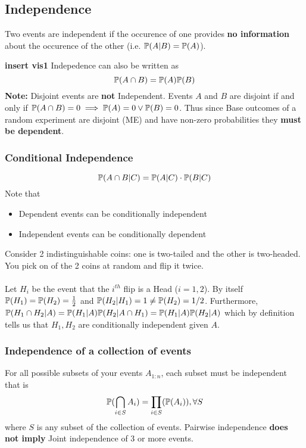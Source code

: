 \documentclass[11pt]{scrartcl}
\begin{document}
\subsection{Independence} 
\begin{definition}
  Two events are independent if the occurence of one provides \textbf{no
  information} about the occurence of the other (i.e. $\mathbb{P}(A|B) = \mathbb{P}(A)$). 
\end{definition}
\textbf{insert vis1}  
Indepedence can also be written as \[
  \mathbb{P}(A\cap B) = \mathbb{P}(A)\mathbb{P}(B)
\] 
\textbf{Note:} Disjoint events are \textbf{not} Independent. Events $A$ and
$B$ are disjoint if and only if $\mathbb{P}(A\cap B) = 0 \implies  \mathbb{P}(A)=0 \lor
\mathbb{P}(B)=0$. Thus since Base outcomes of a random experiment are disjoint (ME)
and have non-zero probabilities they \textbf{must be dependent}.

\subsubsection{Conditional Independence} 
\[
\mathbb{P}(A\cap B|C) = \mathbb{P}(A|C) \cdot \mathbb{P}(B|C)
\] 
Note that \begin{itemize}
  \item Dependent events can be conditionally independent
    \item Independent events can be conditionally dependent
\end{itemize}
\begin{example}
  Consider 2 indistinguishable coins: one is two-tailed and the other is
  two-headed. You pick on of the 2 coins at random and flip it twice. \\\\
  Let $H_{i}$ be the event that the $i^{th} $ flip is a Head ($i=1,2$). By
  itself $\mathbb{P}(H_1)=\mathbb{P}(H_2) = \frac{1}{2}$ and $\mathbb{P}(H_2|H_1) = 1 \neq
  \mathbb{P}(H_2) = 1/2$. Furthermore, $\mathbb{P}(H_1\cap H_2|A) = \mathbb{P}(H_1|A)\mathbb{P}(H_2|A\cap
  H_1)= \mathbb{P}(H_1|A)\mathbb{P}(H_2|A)$ which by definition tells us that $H_1,H_2$ are
  conditionally independent given $A$.
\end{example}

\subsubsection{Independence of a collection of events}
For all possible subsets of your events $A_{1:n} $, each subset must be
independent that is
\[
  \mathbb{P}(\bigcap_{i\in S}A_{i}) = \prod_{i\in S}(\mathbb{P}(A_{i} )), \forall S
\] where $S$ is any subset of the collection of events. Pairwise independence
\textbf{does not imply} Joint independence of 3 or more events. 
\newpage
\end{document}
